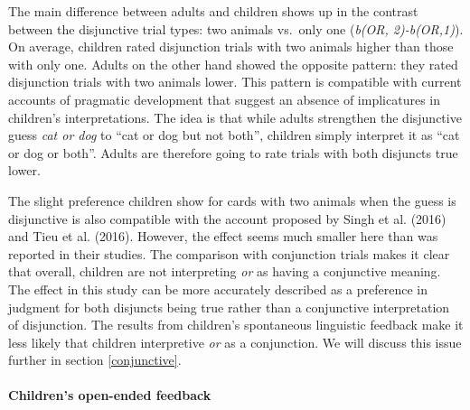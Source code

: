 \documentclass[floatsintext,man]{apa6}
\theoremstyle{definition}
\theoremstyle{definition}
\theoremstyle{definition}
\theoremstyle{remark}
\begin{document}
The main difference between adults and children shows up in the contrast
between the disjunctive trial types: two animals vs.~only one
(\emph{b(OR, 2)-b(OR,1)}). On average, children rated disjunction trials
with two animals higher than those with only one. Adults on the other
hand showed the opposite pattern: they rated disjunction trials with two
animals lower. This pattern is compatible with current accounts of
pragmatic development that suggest an absence of implicatures in
children's interpretations. The idea is that while adults strengthen the
disjunctive guess \emph{cat or dog} to \enquote{cat or dog but not
both}, children simply interpret it as \enquote{cat or dog or both}.
Adults are therefore going to rate trials with both disjuncts true
lower.

The slight preference children show for cards with two animals when the
guess is disjunctive is also compatible with the account proposed by
Singh et al. (2016) and Tieu et al. (2016). However, the effect seems
much smaller here than was reported in their studies. The comparison
with conjunction trials makes it clear that overall, children are not
interpreting \emph{or} as having a conjunctive meaning. The effect in
this study can be more accurately described as a preference in judgment
for both disjuncts being true rather than a conjunctive interpretation
of disjunction. The results from children's spontaneous linguistic
feedback make it less likely that children interpretive \emph{or} as a
conjunction. We will discuss this issue further in section
\ref{conjunctive}.

\paragraph{Children's open-ended
feedback}\label{childrens-open-ended-feedback}
\end{document}
